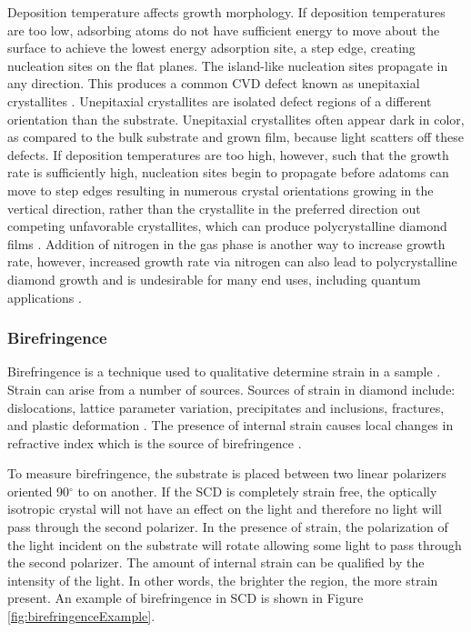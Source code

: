 Deposition temperature affects growth morphology. If deposition temperatures are too low, adsorbing atoms do not have sufficient energy to move about the surface to achieve the lowest energy adsorption site, a step edge, creating nucleation sites on the flat planes. The island-like nucleation sites propagate in any direction. This produces a common CVD defect known as unepitaxial crystallites \cite{Tallaire2008OriginFilms}. Unepitaxial crystallites are isolated defect regions of a different orientation than the substrate. Unepitaxial crystallites often appear dark in color, as compared to the bulk substrate and grown film, because light scatters off these defects. If deposition temperatures are too high, however, such that the growth rate is sufficiently high, nucleation sites begin to propagate before adatoms can move to step edges resulting in numerous crystal orientations growing in the vertical direction, rather than the crystallite in the preferred direction out competing unfavorable crystallites, which can produce polycrystalline diamond films \cite{VanDerDrift1967EVOLUTIONARYLAYERS}. Addition of nitrogen in the gas phase is another way to increase growth rate, however, increased growth rate via nitrogen can also lead to polycrystalline diamond growth and is undesirable for many end uses, including quantum applications \cite{Cao1996GrowthNitrogen}.


\subsubsection{Birefringence}
\label{Birefringence}
\indent

Birefringence is a technique used to qualitative determine strain in a sample \cite{Raman1944BirefringenceDiamond, Lang1967CausesDiamond, Tolansky1964BirefringenceDiamond}. Strain can arise from a number of sources. Sources of strain in diamond include: dislocations, lattice parameter variation, precipitates and inclusions, fractures, and plastic deformation \cite{Lang1967CausesDiamond}. The presence of internal strain causes local changes in refractive index which is the source of birefringence \cite{Atkins1968QuantumRotation}.

To measure birefringence, the substrate is placed between two linear polarizers oriented 90$^\circ$ to on another. If the SCD is completely strain free, the optically isotropic crystal will not have an effect on the light and therefore no light will pass through the second polarizer. In the presence of strain, the polarization of the light incident on the substrate will rotate allowing some light to pass through the second polarizer. The amount of internal strain can be qualified by the intensity of the light. In other words, the brighter the region, the more strain present. An example of birefringence in SCD is shown in Figure \ref{fig:birefringenceExample}.

